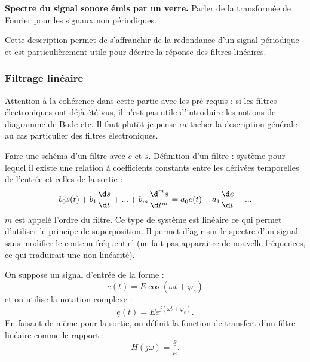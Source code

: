 \begin{slide}
\textbf{Spectre du signal sonore émis par un verre.}
Parler de la transformée de Fourier pour les signaux non périodiques. 
\end{slide}

\begin{transition}
Cette description permet de s'affranchir de la redondance d'un signal périodique et est particulièrement utile pour décrire la réponse des filtres linéaires.
\end{transition}

\subsubsection{Filtrage linéaire}

\begin{remarque}
Attention à la cohérence dans cette partie avec les pré-requis : si les filtres électroniques ont déjà été vus, il n'est pas utile d'introduire les notions de diagramme de Bode etc.
Il faut plutôt je pense rattacher la description générale au cas particulier des filtres électroniques.
\end{remarque}

Faire une schéma d'un filtre avec $e$ et $s$.
Définition d'un filtre : système pour lequel il existe une relation à coefficients constants entre les dérivées temporelles de l'entrée et celles de la sortie :
\begin{equation}
b_0 s(t) + b_1 \frac{\d s}{\d t} + ... + b_m \frac{\d^m s}{\d t^m} = a_0 e(t) + a_1 \frac{\d e}{\d t}+ ...
\end{equation}
$m$ est appelé l'ordre du filtre.
Ce type de système est linéaire ce qui permet d'utiliser le principe de superposition.
Il permet d'agir sur le spectre d'un signal sans modifier le contenu fréquentiel (ne fait pas apparaitre de nouvelle fréquences, ce qui traduirait une non-linéarité).

On suppose un signal d'entrée de la forme :
\begin{equation}
e(t) = E\cos(\omega t+\varphi_e)
\end{equation}
et on utilise la notation complexe :
\begin{equation}
\underline{e}(t) = E e^{j(\omega t + \varphi_e)}.
\end{equation}
En faisant de même pour la sortie, on définit la fonction de transfert d'un filtre linéaire comme le rapport :
\begin{equation}
\underline{H}(j\omega) = \frac{\underline{s}}{\underline{e}}.
\end{equation}

